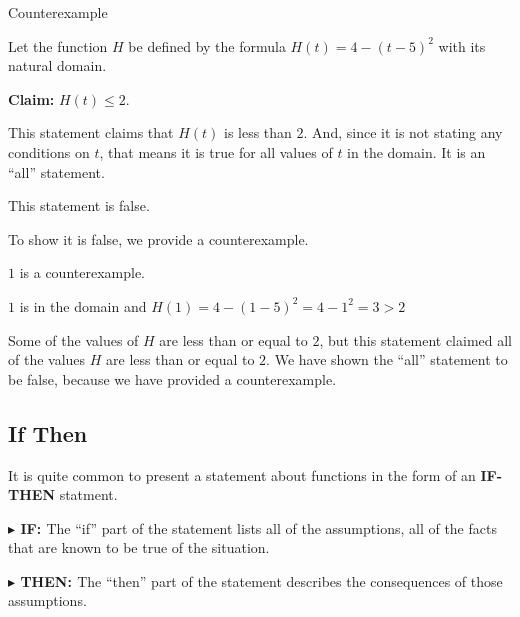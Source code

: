 \documentclass{ximera}
\begin{document}
\begin{example}    Counterexample


Let the function $H$ be defined by the formula $H(t) = 4 - (t-5)^2$ with its natural domain. 

\textbf{\textcolor{blue!55!black}{Claim:}} $H(t) \leq 2$.  



This statement claims that $H(t)$ is less than $2$.  And, since it is not stating any conditions on $t$, that means it is true for all values of $t$ in the domain.  It is an ``all'' statement. 

This statement is false. 

To show it is false, we provide a counterexample. 


$1$ is a counterexample. 


$1$ is in the domain and  $H(1) = 4 - (1-5)^2 = 4 - 1^2 = 3 > 2$ 



Some of the values of $H$ are less than or equal to $2$, but this statement claimed all of the values $H$ are less than or equal to $2$.  We have shown the ``all'' statement to be false, because we have provided a counterexample.



\end{example}



























\subsection*{If Then}


It is quite common to present a statement about functions in the form of an \textbf{IF-THEN} statment.


\textbf{\textcolor{blue!55!black}{$\blacktriangleright$ IF: }} The ``if'' part of the statement lists all of the assumptions, all of the facts that are known to be true of the situation.


\textbf{\textcolor{blue!55!black}{$\blacktriangleright$ THEN: }} The ``then'' part of the statement describes the consequences of those assumptions.
\end{document}
